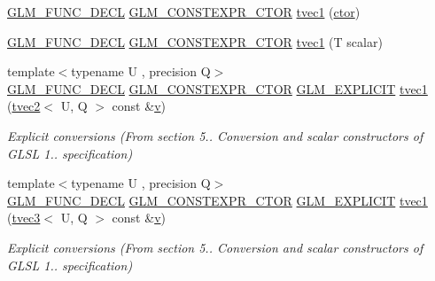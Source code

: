 \begin{DoxyCompactItemize}
\item 
\mbox{\hyperlink{setup_8hpp_ab2d052de21a70539923e9bcbf6e83a51}{G\+L\+M\+\_\+\+F\+U\+N\+C\+\_\+\+D\+E\+CL}} \mbox{\hyperlink{setup_8hpp_ad34178a09666081abdb573c14d1f4a5a}{G\+L\+M\+\_\+\+C\+O\+N\+S\+T\+E\+X\+P\+R\+\_\+\+C\+T\+OR}} \mbox{\hyperlink{structglm_1_1tvec1_a220aa05a31e5cb40d735ae61cf7aad40}{tvec1}} (\mbox{\hyperlink{namespaceglm_a807df837905ec286f806a536af03b57f}{ctor}})
\item 
\mbox{\hyperlink{setup_8hpp_ab2d052de21a70539923e9bcbf6e83a51}{G\+L\+M\+\_\+\+F\+U\+N\+C\+\_\+\+D\+E\+CL}} \mbox{\hyperlink{setup_8hpp_ad34178a09666081abdb573c14d1f4a5a}{G\+L\+M\+\_\+\+C\+O\+N\+S\+T\+E\+X\+P\+R\+\_\+\+C\+T\+OR}} \mbox{\hyperlink{structglm_1_1tvec1_ae08ccaa2bb2b7495ca48a59bcc54afcd}{tvec1}} (T scalar)
\item 
{\footnotesize template$<$typename U , precision Q$>$ }\\\mbox{\hyperlink{setup_8hpp_ab2d052de21a70539923e9bcbf6e83a51}{G\+L\+M\+\_\+\+F\+U\+N\+C\+\_\+\+D\+E\+CL}} \mbox{\hyperlink{setup_8hpp_ad34178a09666081abdb573c14d1f4a5a}{G\+L\+M\+\_\+\+C\+O\+N\+S\+T\+E\+X\+P\+R\+\_\+\+C\+T\+OR}} \mbox{\hyperlink{setup_8hpp_a6c74f5a5e7b134ab69023ff9a30d4d5d}{G\+L\+M\+\_\+\+E\+X\+P\+L\+I\+C\+IT}} \mbox{\hyperlink{structglm_1_1tvec1_ae0c4ccec3b42ad5594f8e8870395ac49}{tvec1}} (\mbox{\hyperlink{structglm_1_1tvec2}{tvec2}}$<$ U, Q $>$ const \&\mbox{\hyperlink{glad_8h_a14cfbe2fc2234f5504618905b69d1e06}{v}})
\begin{DoxyCompactList}\small\item\em Explicit conversions (From section 5.. Conversion and scalar constructors of G\+L\+SL 1.. specification) \end{DoxyCompactList}\item 
{\footnotesize template$<$typename U , precision Q$>$ }\\\mbox{\hyperlink{setup_8hpp_ab2d052de21a70539923e9bcbf6e83a51}{G\+L\+M\+\_\+\+F\+U\+N\+C\+\_\+\+D\+E\+CL}} \mbox{\hyperlink{setup_8hpp_ad34178a09666081abdb573c14d1f4a5a}{G\+L\+M\+\_\+\+C\+O\+N\+S\+T\+E\+X\+P\+R\+\_\+\+C\+T\+OR}} \mbox{\hyperlink{setup_8hpp_a6c74f5a5e7b134ab69023ff9a30d4d5d}{G\+L\+M\+\_\+\+E\+X\+P\+L\+I\+C\+IT}} \mbox{\hyperlink{structglm_1_1tvec1_a8975bff3a3ce2e9be8205f94d54330aa}{tvec1}} (\mbox{\hyperlink{structglm_1_1tvec3}{tvec3}}$<$ U, Q $>$ const \&\mbox{\hyperlink{glad_8h_a14cfbe2fc2234f5504618905b69d1e06}{v}})
\begin{DoxyCompactList}\small\item\em Explicit conversions (From section 5.. Conversion and scalar constructors of G\+L\+SL 1.. specification) \end{DoxyCompactList}\item 

\end{DoxyCompactItemize}
